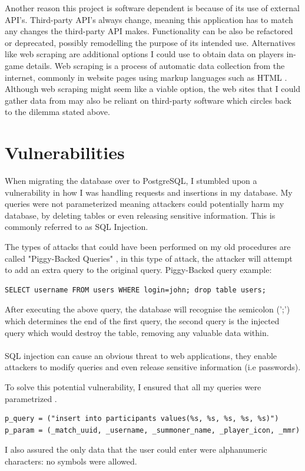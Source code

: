 Another reason this project is software dependent is because of its use of external API's.
Third-party API's always change, meaning this application has to match any changes the third-party API makes. Functionality can be also be refactored or deprecated, possibly remodelling the purpose of its intended use. \hfill \break
Alternatives like web scraping are additional options I could use to obtain data on players in-game details. Web scraping is a process of automatic data collection from the internet, commonly in website pages using markup languages such as HTML \cite{slamet2018web}. Although web scraping might seem like a viable option, the web sites that I could gather data from may also be reliant on third-party software which circles back to the dilemma stated above.
\section{Vulnerabilities}
When migrating the database over to PostgreSQL, I stumbled upon a vulnerability in how I was handling requests and insertions in my database. My queries were not parameterized meaning attackers could potentially harm my database, by deleting tables or even releasing sensitive information. This is commonly referred to as SQL Injection. 

The types of attacks that could have been performed on my old procedures are called "Piggy-Backed Queries" \cite{halfond2006classification}, in this type of attack, the attacker will attempt to add an extra query to the original query. 
\newline Piggy-Backed query example:

\begin{verbatim}
SELECT username FROM users WHERE login=john; drop table users;
\end{verbatim}

After executing the above query, the database will recognise the semicolon (';') which determines the end of the first query, the second query is the injected query which would destroy the table, removing any valuable data within.

\paragraph{}
SQL injection \cite{halfond2006classification} can cause an obvious threat to web applications, they enable attackers to modify queries and even release sensitive information (i.e passwords).

To solve this potential vulnerability, I ensured that all my queries were parametrized \cite{psycopg}.
\begin{verbatim}
p_query = ("insert into participants values(%s, %s, %s, %s, %s)")
p_param = (_match_uuid, _username, _summoner_name, _player_icon, _mmr)
\end{verbatim}
I also assured the only data that the user could enter were alphanumeric characters: no symbols were allowed.

